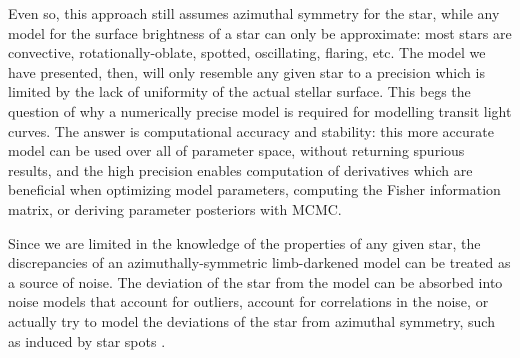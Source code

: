 \documentclass[modern]{aastex61}
\begin{document}
Even so, this approach still assumes azimuthal symmetry for the star, while 
any model for the surface brightness of a star can only be approximate:
most stars are convective, rotationally-oblate, spotted, oscillating, flaring,
etc.  The model we have presented, then, will only resemble any given star to
a precision which is limited by the lack of uniformity of the actual stellar
surface.  This begs the question of why a numerically precise model is required
for modelling transit light curves.  The answer is computational accuracy
and stability: this more accurate model can be used over all of parameter space,
without returning spurious results, and the high precision enables computation 
of derivatives which are beneficial when optimizing model parameters, computing 
the Fisher information matrix, or deriving parameter posteriors with MCMC.

Since we are limited in the knowledge of the properties of any given star,
the discrepancies of an azimuthally-symmetric limb-darkened model can be
treated as a source of noise.
The deviation of the star from the model can be absorbed into noise models that
account for outliers, account for correlations in the noise, or actually
try to model the deviations of the star from azimuthal symmetry, such as
induced by star spots \citep[e.g.][]{SanchisOjeda2011}.

\end{document}

